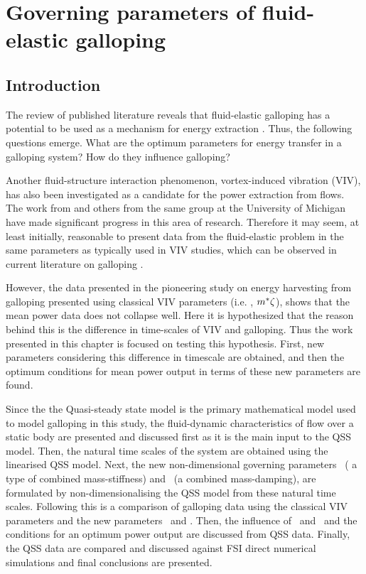 \chapter{Governing parameters of fluid-elastic galloping}
\label{chap:pi_1_pi2}
\section{Introduction}

The review of published literature reveals that fluid-elastic galloping has a potential to be used as a mechanism for energy extraction \citep{Barrero-Gil2010a}. Thus, the following questions emerge. What are the optimum parameters for energy transfer in a galloping system? How do they influence galloping?

Another fluid-structure interaction phenomenon, vortex-induced vibration (VIV), has also been investigated as a candidate for the power extraction from flows. The work from \citet{Bernitsas2008a-concept, Bernitsas2009, Raghavan2010a, Lee2011b} and others from the same group at the University of Michigan have made significant progress in this area of research. Therefore it may seem, at least initially, reasonable to present data from the fluid-elastic problem in the same parameters as typically used in VIV studies, which can be observed in current literature on galloping \citep{Barrero-Gil2009,Barrero-Gil2010a,Parkinson1964}.



However, the data presented in the pioneering study on energy harvesting from galloping  \citep{Barrero-Gil2010a} presented using classical VIV parameters (i.e. \ustar, $m^{*}\zeta$), shows that the mean power data does not collapse well. Here it is hypothesized that the reason behind this is the difference in time-scales of VIV and galloping. Thus the work presented in this chapter is focused on testing this hypothesis. First, new parameters considering this difference in timescale are obtained, and then the optimum conditions for mean power output in terms of these new parameters are found. 

Since the the Quasi-steady state model is the primary mathematical model used to model galloping in this study, the fluid-dynamic characteristics of flow over a static body are presented and discussed first as it is the main input to the QSS model. Then, the natural time scales of the system are obtained using the linearised QSS model. Next, the new non-dimensional governing parameters  \massstiff\ ( a type of combined mass-stiffness) and \massdamp\ (a combined mass-damping), are formulated by non-dimensionalising the QSS model from these natural time scales. Following this is a comparison of galloping data using the classical VIV parameters and the new parameters \massstiff\ and \massdamp. Then, the influence of \massstiff \ and \massdamp \ and the conditions for an optimum power output are discussed from QSS data. Finally, the QSS data are compared and discussed against FSI direct numerical simulations and final conclusions are presented.

